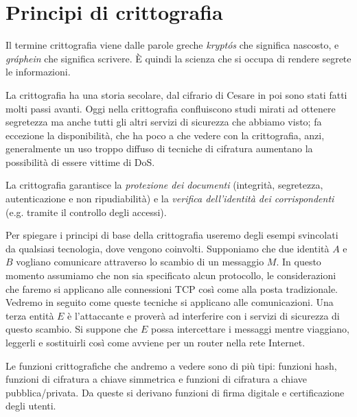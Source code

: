 \section{Principi di crittografia}
Il termine crittografia viene dalle parole greche \textit{kryptós} che significa nascosto, e \textit{gráphein} che significa scrivere. È quindi la scienza che si occupa di rendere segrete le informazioni.

La crittografia ha una storia secolare, dal cifrario di Cesare in poi sono stati fatti molti passi avanti. Oggi nella crittografia confluiscono studi mirati ad ottenere segretezza ma anche tutti gli altri servizi di sicurezza che abbiamo visto; fa eccezione la disponibilità, che ha poco a che vedere con la crittografia, anzi, generalmente un uso troppo diffuso di tecniche di cifratura aumentano la possibilità di essere vittime di DoS.

La crittografia garantisce la \textit{protezione dei documenti} (integrità, segretezza, autenticazione e non ripudiabilità) e la \textit{verifica dell'identità dei corrispondenti} (e.g. tramite il controllo degli accessi).

Per spiegare i principi di base della crittografia useremo degli esempi svincolati da qualsiasi tecnologia, dove vengono coinvolti. Supponiamo che due identità $A$ e $B$ vogliano comunicare attraverso lo scambio di un messaggio $M$. In questo momento assumiamo che non sia specificato alcun protocollo, le considerazioni che faremo si applicano alle connessioni TCP così come alla posta tradizionale. Vedremo in seguito come queste tecniche si applicano alle comunicazioni. Una terza entità $E$ è l'attaccante e proverà ad interferire con i servizi di sicurezza di questo scambio. Si suppone che $E$ possa intercettare i messaggi mentre viaggiano, leggerli e sostituirli così come avviene per un router nella rete Internet.

Le funzioni crittografiche che andremo a vedere sono di più tipi: funzioni hash, funzioni di cifratura a chiave simmetrica e funzioni di cifratura a chiave pubblica/privata. Da queste si derivano funzioni di firma digitale e certificazione degli utenti.

